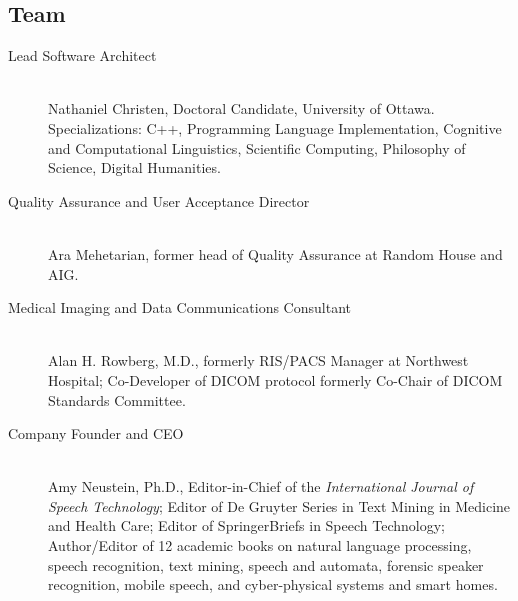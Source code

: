 
\begin{frame}{}
\section{Team}


\begin{center}
\begin{minipage}{0.94\textwidth}
{\LARGE \setlength{\leftmargini}{3pt}\begin{description}
\item[Lead Software Architect]  {\llsep} \\Nathaniel Christen, Doctoral Candidate, University of Ottawa.  
Specializations: C++, Programming Language 
Implementation, Cognitive and Computational 
Linguistics, Scientific Computing, Philosophy 
of Science, Digital Humanities.{\thrule}
\item[Quality Assurance and User Acceptance 
Director]  {\llsep} \\Ara Mehetarian, 
former head of Quality Assurance at Random House and AIG.{\thrule}
\item[Medical Imaging and Data Communications Consultant]  {\llsep} \\Alan H. Rowberg, M.D., formerly
RIS/PACS Manager at Northwest Hospital; Co-Developer of DICOM protocol formerly Co-Chair
of DICOM Standards Committee.{\thrule}
\item[Company Founder and CEO]  {\llsep} \\Amy Neustein, Ph.D., Editor-in-Chief of the \textit{International Journal of
Speech Technology}; Editor of De Gruyter Series in Text Mining in Medicine and Health Care;
Editor of SpringerBriefs in Speech Technology; Author/Editor of 12 academic books on 
natural language processing, speech recognition, 
text mining, speech and
automata, forensic speaker recognition, 
mobile speech, and cyber-physical systems 
and smart homes.\vspace{1em}  
\end{description}}
\end{minipage}
\end{center}


\end{frame}
